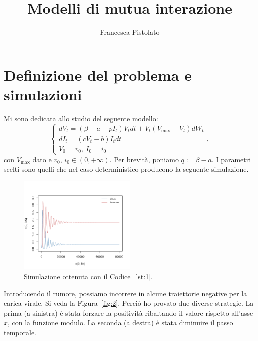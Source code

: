 \documentclass[12pt,a4paper,oneside]{article}
\author{Francesca Pistolato}
\title{Modelli di mutua interazione}
\date{}
\theoremstyle{definition}
\begin{document}
\maketitle
\tableofcontents
\section{Definizione del problema e simulazioni}
Mi sono dedicata allo studio del seguente modello:
\begin{equation}\tag{1}
\begin{cases}
dV_t=\left(\beta -a -pI_t\right)V_tdt + V_t(V_{\max}-V_t)dW_t\\
dI_t=\left(cV_t-b\right)I_tdt \\
V_0 = v_0, \ I_0 = i_0
\end{cases},
\end{equation}
con $V_{\max}$ dato e $v_0$, $i_0\in (0,+\infty)$. Per brevità, poniamo $q:=\beta-a$. I parametri scelti sono quelli che nel caso deterministico producono la seguente simulazione.

\begin{figure}[ht]
\centering
\caption{Simulazione ottenuta con il Codice~\ref{lst:1}.}
\includegraphics[width=0.5\textwidth]{inte_1}
\end{figure}

Introducendo il rumore, possiamo incorrere in alcune traiettorie negative per la carica virale. Si veda la Figura~\ref{fig:2}. Perciò ho provato due diverse strategie. La prima (a sinistra) è stata forzare la positività ribaltando il valore rispetto all'asse $x$, con la funzione modulo. La seconda (a destra) è stata diminuire il passo temporale.
\end{document}
